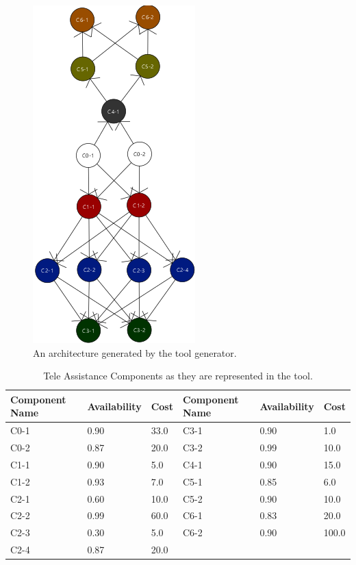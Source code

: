 \begin{figure}[ht]
	\centerline
	{\includegraphics[scale=0.9]{img/autogenerated_arch.png}}
	\caption[AutoGenerated Architecture]{An architecture generated by the tool generator.}
	\label{fig:testarch}
\end{figure}

\begin{table}[ht!b]
	\centering
	\begin{tabular}{|p{2cm}|p{2cm}|p{1cm}||p{2cm}|p{2cm}|p{1cm}|}
		\hline 
		\textbf{Component Name} & \textbf{Availability} & \textbf{Cost} & \textbf{Component Name} & \textbf{Availability} & \textbf{Cost} \\ 
		\hline 
		C0-1 & 0.90 & 33.0 & C3-1 & 0.90 & 1.0 \\
		\hline 
		C0-2 & 0.87 & 20.0 & C3-2 & 0.99 & 10.0 \\ 
		\hline 
		C1-1 & 0.90 & 5.0 & C4-1 & 0.90 & 15.0 \\ 
		\hline 
		C1-2 & 0.93 & 7.0 & C5-1 & 0.85 & 6.0 \\ 
		\hline
		C2-1 & 0.60 & 10.0 & C5-2 & 0.90 & 10.0 \\ 
		\hline
		C2-2 & 0.99 & 60.0 & C6-1 & 0.83 & 20.0 \\ 
		\hline
		C2-3 & 0.30 & 5.0 & C6-2 & 0.90 & 100.0 \\ 
		\hline
		C2-4 & 0.87 & 20.0 & & & \\ 
		\hline
	\end{tabular} 
	\caption[TAS Components]{Tele Assistance Components as they are represented in the tool.}
	\label{tab:ag-comp}
\end{table}

